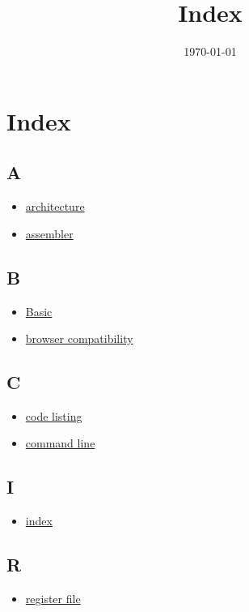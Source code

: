 \documentclass[11pt]{article}
\date{\today}
\title{Index}
\begin{document}
\maketitle

\section{Index}
\label{sec:org4d51262}
\subsection{A}
\label{sec:orgc61ad33}
\begin{itemize}
\item \href{Sigma16UserGuide.org}{architecture}
\item \href{Sigma16UserGuide.org}{assembler}
\end{itemize}
\subsection{B}
\label{sec:org89cb258}
\begin{itemize}
\item \href{Sigma16UserGuide.org}{Basic}
\item \href{Sigma16UserGuide.org}{browser compatibility}
\end{itemize}
\subsection{C}
\label{sec:org478ea6d}
\begin{itemize}
\item \href{Sigma16UserGuide.org}{code listing}
\item \href{Sigma16UserGuide.org}{command line}
\end{itemize}
\subsection{I}
\label{sec:orgbd1a52d}
\begin{itemize}
\item \href{Sigma16UserGuide.org}{index}
\end{itemize}
\subsection{R}
\label{sec:orgb395ed0}
\begin{itemize}
\item \href{Sigma16UserGuide.org}{register file}
\end{itemize}
\end{document}
